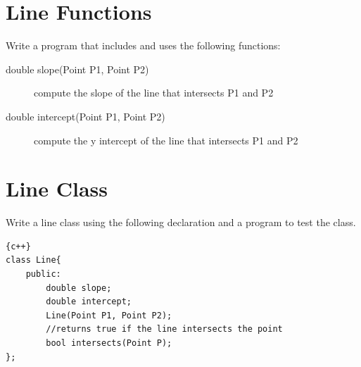 \documentclass{article}
\begin{document}
\section*{Line Functions}
Write a program that includes and uses the following functions:
\begin{description}
	\item[double slope(Point P1, Point P2)] compute the slope of the line that intersects P1 and P2
	\item[double intercept(Point P1, Point P2)] compute the y intercept of the line that intersects P1 and P2
\end{description}

\section*{Line Class}
Write a line class using the following declaration and a program to test the class. 
\begin{lstlisting}{c++}
class Line{
	public: 
		double slope;
		double intercept;
		Line(Point P1, Point P2);
		//returns true if the line intersects the point
		bool intersects(Point P);
};
\end{lstlisting}
\end{document}
